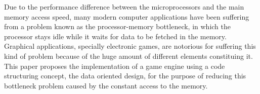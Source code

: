 Due to the performance difference between the microprocessors and the main memory access 
speed, many modern computer applications have been suffering from a problem known as 
the processor-memory bottleneck, in which the processor stays idle while it waits for 
data to be fetched in the memory. Graphical applications, specially electronic games, are 
notorious for suffering this kind of problem because of the huge amount of different 
elements constituing it. This paper proposes the implementation of a game engine
using a code structuring concept, the data oriented design, for the purpose of reducing
this bottleneck problem caused by the constant access to the memory. 
